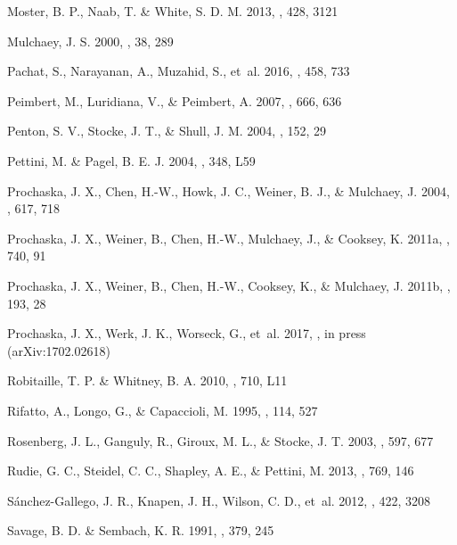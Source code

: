 \documentclass[twocolumn,twocolappendix,tighten,times]{aastex6}
\begin{document}
\begin{thebibliography}
 Moster, B. P., Naab, T. \& White, S. D. M. 2013, \mnras, 428, 3121

 Mulchaey, J. S. 2000, \araa, 38, 289

 Pachat, S., Narayanan, A., Muzahid, S., et~al. 2016, \mnras, 458, 733

 Peimbert, M., Luridiana, V., \& Peimbert, A. 2007, \apj, 666, 636

 Penton, S. V., Stocke, J. T., \& Shull, J. M. 2004, \apjs, 152, 29

 Pettini, M. \& Pagel, B. E. J. 2004, \mnras, 348, L59

 Prochaska, J. X., Chen, H.-W., Howk, J. C., Weiner, B. J., \& Mulchaey, J. 2004, \apj, 617, 718

 Prochaska, J. X., Weiner, B., Chen, H.-W., Mulchaey, J., \& Cooksey, K. 2011a, \apj, 740, 91

 Prochaska, J. X., Weiner, B., Chen, H.-W., Cooksey, K., \& Mulchaey, J. 2011b, \apjs, 193, 28

 Prochaska, J. X., Werk, J. K., Worseck, G., et~al. 2017, \apj, in press (arXiv:1702.02618)

 Robitaille, T. P. \& Whitney, B. A. 2010, \apjl, 710, L11

 Rifatto, A., Longo, G., \& Capaccioli, M. 1995, \aaps, 114, 527

 Rosenberg, J. L., Ganguly, R., Giroux, M. L., \& Stocke, J. T. 2003, \apj, 597, 677

 Rudie, G. C., Steidel, C. C., Shapley, A. E., \& Pettini, M. 2013, \apj, 769, 146

 S\'anchez-Gallego, J. R., Knapen, J. H., Wilson, C. D., et~al. 2012, \mnras, 422, 3208

 Savage, B. D. \& Sembach, K. R. 1991, \apj, 379, 245


\end{thebibliography}
\end{document}
